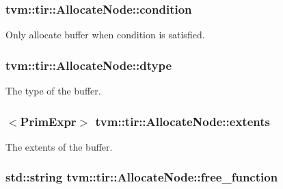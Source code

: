 \subsubsection[{\texorpdfstring{condition}{condition}}]{ tvm\+::tir\+::\+Allocate\+Node\+::condition}\hypertarget{classtvm_1_1tir_1_1AllocateNode_a6b855ad51d1fcb4e21e9afe657f77ba5}{}\label{classtvm_1_1tir_1_1AllocateNode_a6b855ad51d1fcb4e21e9afe657f77ba5}


Only allocate buffer when condition is satisfied. 

\subsubsection[{\texorpdfstring{dtype}{dtype}}]{ tvm\+::tir\+::\+Allocate\+Node\+::dtype}\hypertarget{classtvm_1_1tir_1_1AllocateNode_aba885cfd49a10c594320d0e84a9a4c90}{}\label{classtvm_1_1tir_1_1AllocateNode_aba885cfd49a10c594320d0e84a9a4c90}


The type of the buffer. 

\subsubsection[{\texorpdfstring{extents}{extents}}]{$<${\bf Prim\+Expr}$>$ tvm\+::tir\+::\+Allocate\+Node\+::extents}\hypertarget{classtvm_1_1tir_1_1AllocateNode_a0f6d59cffc5fda07450e0fdab6b66bcb}{}\label{classtvm_1_1tir_1_1AllocateNode_a0f6d59cffc5fda07450e0fdab6b66bcb}


The extents of the buffer. 

\subsubsection[{\texorpdfstring{free\+\_\+function}{free_function}}]{\setlength{\rightskip}{0pt plus 5cm}std\+::string tvm\+::tir\+::\+Allocate\+Node\+::free\+\_\+function}\hypertarget{classtvm_1_1tir_1_1AllocateNode_ac2c84aa70f243d933c0480331910de52}{}\label{classtvm_1_1tir_1_1AllocateNode_ac2c84aa70f243d933c0480331910de52}
